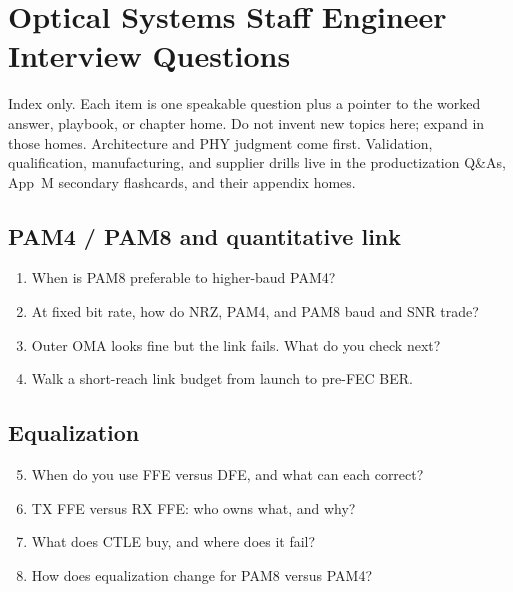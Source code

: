 \chapter{Optical Systems Staff Engineer Interview Questions}
\label{app:top25}

Index only. Each item is one speakable question plus a pointer to the worked
answer, playbook, or chapter home. Do not invent new topics here; expand in
those homes. Architecture and PHY judgment come first. Validation,
qualification, manufacturing, and supplier drills live in the productization
Q\&As, App~M secondary flashcards, and their appendix homes.

\section{PAM4 / PAM8 and quantitative link}

\begin{enumerate}
\item When is PAM8 preferable to higher-baud PAM4?
      \hfill {}
\item At fixed bit rate, how do NRZ, PAM4, and PAM8 baud and SNR trade?
      \hfill {}
\item Outer OMA looks fine but the link fails. What do you check next?
      \hfill {}
\item Walk a short-reach link budget from launch to pre-FEC BER.
      \hfill {}
\end{enumerate}

\section{Equalization}

\begin{enumerate}
\setcounter{enumi}{4}
\item When do you use FFE versus DFE, and what can each correct?
      \hfill {}
\item TX FFE versus RX FFE: who owns what, and why?
      \hfill {}
\item What does CTLE buy, and where does it fail?
      \hfill {}
\item How does equalization change for PAM8 versus PAM4?
      \hfill {}
\end{enumerate}

